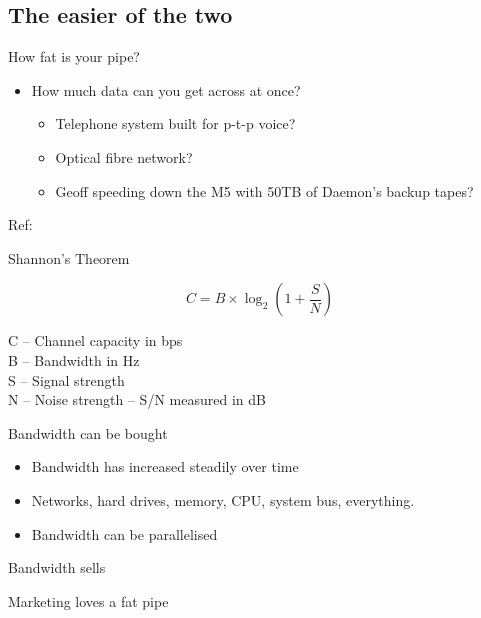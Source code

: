 \documentclass{beamer}
\begin{document}
\subsection{The easier of the two}

\begin{frame}{How fat is your pipe?}
  \begin{itemize}
  \item How much data can you get across at once?
    \begin{itemize}
    \item<2-> Telephone system built for p-t-p voice?
    \item<3-> Optical fibre network?
    \item<4-> Geoff speeding down the M5 with 50TB of Daemon's backup tapes?
    \end{itemize}
  \end{itemize}
  \vfill
  \tiny{Ref: \href{http://www.inf.fu-berlin.de/lehre/WS01/19548-U/shannon.html}{}}
\end{frame}

\begin{frame}{Shannon's Theorem}
  \begin{center}
  \[ C = B \times \log_2(1+\frac{S}{N}) \]
  \end{center}
  \vfill
  \small{
  C -- Channel capacity in bps \\
  B -- Bandwidth in Hz \\
  S -- Signal strength \\
  N -- Noise strength -- S/N measured in dB
  }
\end{frame}

\begin{frame}{Bandwidth can be bought}
  \begin{itemize}
  \item Bandwidth has increased steadily over time
  \item Networks, hard drives, memory, CPU, system bus, everything.
  \item Bandwidth can be parallelised
  \end{itemize}
\end{frame}

\begin{frame}{Bandwidth sells}
  \begin{block}{}
  \begin{center}
  Marketing loves a fat pipe
  \end{center}
  \end{block}
\end{frame}
\end{document}
